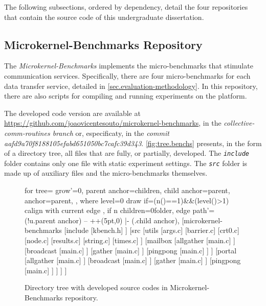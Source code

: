 	The following subsections, ordered by dependency, detail the four
	repositories that contain the source code of this undergraduate dissertation.

	\subsection{Microkernel-Benchmarks Repository}

		The \textit{Microkernel-Benchmarks} implements the micro-benchmarks
		that stimulate communication services. Specifically, there are four
		micro-benchmarks for each data transfer service, detailed in
		\autoref{sec.evaluation-methodology}. In this repository, there
		are also scripts for compiling and running experiments on the
		\mppa platform.

		The developed code version are available at
		\url{https://github.com/joaovicentesouto/microkernel-benchmarks},
		in the \textit{collective-comm-routines branch} or, especificaty,
		in the \textit{commit aafd9a70f8188105efabd651050bc7cafc39d343}.
		\autoref{fig:tree.benchs} presents, in the form of a directory
		tree, all files that are fully, or partially, developed. The
		\textit{\texttt{include}} folder contains only one file with static
		experiment settings. The \textit{\texttt{src}} folder is made up of
		auxiliary files and the micro-benchmarks themselves.

		\begin{figure}[!ht]
			\centering%
			\caption{Directory tree with developed source codes in Microkernel-Benchmarks repository.}%
			\label{fig:tree.benchs}%
			\begin{forest}
			for tree={
				grow'=0,
				parent anchor=children,
				child anchor=parent,
				anchor=parent,
			},
			where level=0{
				draw
			}{
				if={(n()==1)&&(level()>1)}{
				calign with current edge
				}{},
				if n children=0{folder}{},
				edge path'={(!u.parent anchor) -- ++(5pt,0) |- (.child anchor)},
			}
			[microkernel-benchmarks
				[include
					[kbench.h]
				]
				[src
					[utils
						[args.c]
						[barrier.c]
						[crt0.c]
						[node.c]
						[results.c]
						[string.c]
						[times.c]
					]
					[mailbox
						[allgather
							[main.c]
						]
						[broadcast
							[main.c]
						]
						[gather
							[main.c]
						]
						[pingpong
							[main.c]
						]
					]
					[portal
						[allgather
							[main.c]
						]
						[broadcast
							[main.c]
						]
						[gather
							[main.c]
						]
						[pingpong
							[main.c]
						]
					]
				]
			]
			\end{forest}%
		\end{figure}

